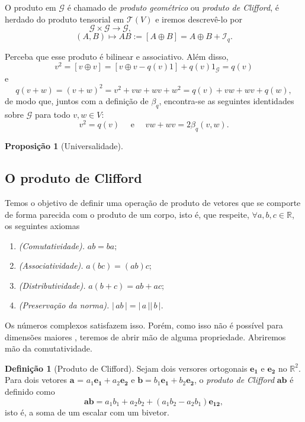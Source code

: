 \documentclass[a4paper,12pt]{report}
\theoremstyle{plain}
\newtheorem{proposicao}{Proposição}[section]
\theoremstyle{definition}
\newtheorem{definicao}{Definição}[section]
\begin{document}
	O produto em $\mathcal{G}$ é chamado de \textit{produto geométrico} ou \textit{produto de Clifford}, é herdado do produto tensorial em $\mathcal{T}(V)$ e iremos descrevê-lo por $$\mathcal{G}\times \mathcal{G}\rightarrow\mathcal{G},\quad \quad \quad\quad \quad \quad\quad \quad\quad \quad\ \ $$$$(A,B)\mapsto AB:= [A\oplus B] = A\oplus
	 B+\mathcal{I}_q.$$
	 
	Perceba que esse produto é bilinear e associativo. Além disso, $$v^2 = [v\oplus v] = [v\oplus v-q(v)1] + q(v)1_\mathcal{G} = q(v)$$ e $$q(v+w) = (v+w)^2 = v^2 + vw + wv + w^2 = q(v) + vw + wv + q(w),$$
	de modo que, juntos com a definição de $\beta_q$, encontra-se as seguintes identidades sobre $\mathcal{G}$ para todo $v,w \in V$: $$v^2 = q(v)\quad \text{ e } \quad vw+wv = 2\beta_q(v,w).$$
	
	\begin{proposicao}[Universalidade]
		
	\end{proposicao} 
	 
	\subsection{O produto de Clifford}
	
	Temos o objetivo de definir uma operação de produto de vetores que se comporte de forma parecida com o produto de um corpo, isto é, que respeite, $\forall a,b,c \in \mathbb{R}$, os seguintes axiomas
	\begin{enumerate}
		\item \emph{(Comutatividade).} $ab = ba;$
		\item \emph{(Associatividade).} $a(bc)=(ab)c;$
		\item \emph{(Distributividade).} $a(b+c)=ab+ac;$
		\item \emph{(Preservação da norma).} $|\,ab\,| = |\,a\,||\,b\,|.$
	\end{enumerate}
	
	Os números complexos satisfazem isso. Porém, como isso não é possível para dimensões maiores \cite{lounestoClifford}, teremos de abrir mão de alguma propriedade. Abriremos mão da comutatividade.
	
	\begin{definicao}[Produto de Clifford]
		Sejam dois versores ortogonais $\mathbf{e_1}$ e $\mathbf{e_2}$ no $\mathbb{R}^2$. Para dois vetores $\mathbf{a}$ = $a_1\mathbf{e_1} + a_2\mathbf{e_2}$ e $\mathbf b = b_1\mathbf{e_1} + b_2\mathbf{e_2}$, o \emph{produto de Clifford} $\mathbf{ab}$ é definido como $$\mathbf{ab} = a_1b_1 + a_2b_2 + (a_1b_2-a_2b_1)\mathbf{e_{12}},$$
		isto é, a soma de um escalar com um bivetor.
	\end{definicao}
	
\end{document}
